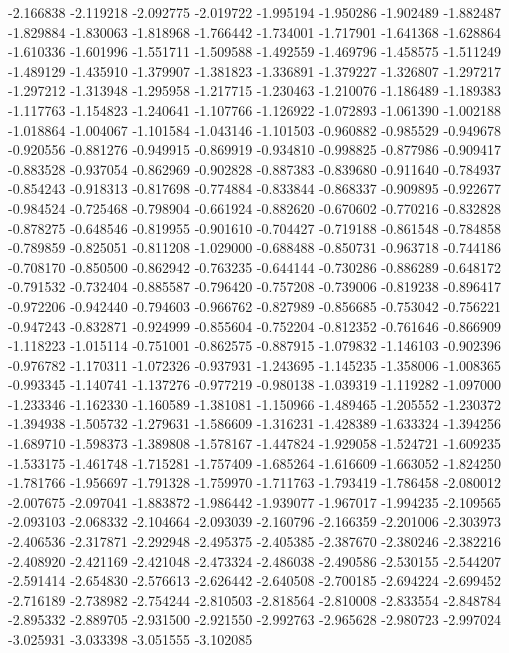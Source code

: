 -2.166838
-2.119218
-2.092775
-2.019722
-1.995194
-1.950286
-1.902489
-1.882487
-1.829884
-1.830063
-1.818968
-1.766442
-1.734001
-1.717901
-1.641368
-1.628864
-1.610336
-1.601996
-1.551711
-1.509588
-1.492559
-1.469796
-1.458575
-1.511249
-1.489129
-1.435910
-1.379907
-1.381823
-1.336891
-1.379227
-1.326807
-1.297217
-1.297212
-1.313948
-1.295958
-1.217715
-1.230463
-1.210076
-1.186489
-1.189383
-1.117763
-1.154823
-1.240641
-1.107766
-1.126922
-1.072893
-1.061390
-1.002188
-1.018864
-1.004067
-1.101584
-1.043146
-1.101503
-0.960882
-0.985529
-0.949678
-0.920556
-0.881276
-0.949915
-0.869919
-0.934810
-0.998825
-0.877986
-0.909417
-0.883528
-0.937054
-0.862969
-0.902828
-0.887383
-0.839680
-0.911640
-0.784937
-0.854243
-0.918313
-0.817698
-0.774884
-0.833844
-0.868337
-0.909895
-0.922677
-0.984524
-0.725468
-0.798904
-0.661924
-0.882620
-0.670602
-0.770216
-0.832828
-0.878275
-0.648546
-0.819955
-0.901610
-0.704427
-0.719188
-0.861548
-0.784858
-0.789859
-0.825051
-0.811208
-1.029000
-0.688488
-0.850731
-0.963718
-0.744186
-0.708170
-0.850500
-0.862942
-0.763235
-0.644144
-0.730286
-0.886289
-0.648172
-0.791532
-0.732404
-0.885587
-0.796420
-0.757208
-0.739006
-0.819238
-0.896417
-0.972206
-0.942440
-0.794603
-0.966762
-0.827989
-0.856685
-0.753042
-0.756221
-0.947243
-0.832871
-0.924999
-0.855604
-0.752204
-0.812352
-0.761646
-0.866909
-1.118223
-1.015114
-0.751001
-0.862575
-0.887915
-1.079832
-1.146103
-0.902396
-0.976782
-1.170311
-1.072326
-0.937931
-1.243695
-1.145235
-1.358006
-1.008365
-0.993345
-1.140741
-1.137276
-0.977219
-0.980138
-1.039319
-1.119282
-1.097000
-1.233346
-1.162330
-1.160589
-1.381081
-1.150966
-1.489465
-1.205552
-1.230372
-1.394938
-1.505732
-1.279631
-1.586609
-1.316231
-1.428389
-1.633324
-1.394256
-1.689710
-1.598373
-1.389808
-1.578167
-1.447824
-1.929058
-1.524721
-1.609235
-1.533175
-1.461748
-1.715281
-1.757409
-1.685264
-1.616609
-1.663052
-1.824250
-1.781766
-1.956697
-1.791328
-1.759970
-1.711763
-1.793419
-1.786458
-2.080012
-2.007675
-2.097041
-1.883872
-1.986442
-1.939077
-1.967017
-1.994235
-2.109565
-2.093103
-2.068332
-2.104664
-2.093039
-2.160796
-2.166359
-2.201006
-2.303973
-2.406536
-2.317871
-2.292948
-2.495375
-2.405385
-2.387670
-2.380246
-2.382216
-2.408920
-2.421169
-2.421048
-2.473324
-2.486038
-2.490586
-2.530155
-2.544207
-2.591414
-2.654830
-2.576613
-2.626442
-2.640508
-2.700185
-2.694224
-2.699452
-2.716189
-2.738982
-2.754244
-2.810503
-2.818564
-2.810008
-2.833554
-2.848784
-2.895332
-2.889705
-2.931500
-2.921550
-2.992763
-2.965628
-2.980723
-2.997024
-3.025931
-3.033398
-3.051555
-3.102085
